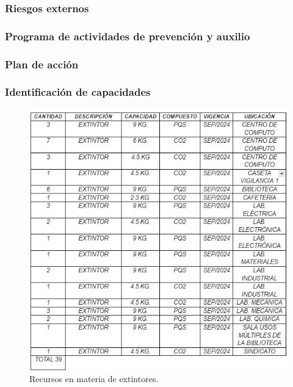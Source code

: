     \subsubsection{Riesgos externos}
    
    \subsubsection{Programa de actividades de prevención y auxilio}
    
    
    
    \subsubsection{Plan de acción}
    
    \subsubsection{Identificación de capacidades}
    
    \begin{figure}[H]
        \centering
        \includegraphics[scale=0.5]{35/Img/extintores.png}
        \caption{Recursos en materia de extintores.}
    \end{figure}
    
